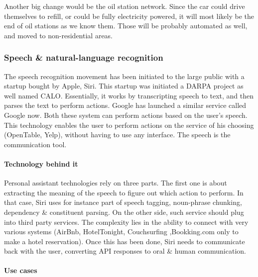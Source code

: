 \documentclass[12pt]{article}
\begin{document}
\smallskip

Another big change would be the oil station network. Since the car could drive
themselves to refill, or could be fully electricity powered, it will most likely
be the end of oil stations as we know them. Those will be probably automated as
well, and moved to non-residential areas.


\subsubsection{Speech \& natural-language recognition}

The speech recognition movement has been initiated to the large public with a
startup bought by Apple, Siri. This startup was initiated a DARPA project as
well named CALO. Essentially, it works by transcripting speech to text, and then
parses the text to perform actions. Google has launched a similar service called
Google now. Both these system can perform actions based on the user's speech.
This technology enables the user to perform actions on the service of his
choosing (OpenTable, Yelp), without having to use any interface. The speech is
the communication tool.
\\

\paragraph{Technology behind it}
Personal assistant technologies rely on three parts.
The first one is about extracting the meaning of the speech to figure out which
action to perform. In that case, Siri uses for instance part of speech tagging,
noun-phrase chunking, dependency \& constituent parsing. On the other side,
such service should plug into third party services. The complexity lies in the
ability to connect with very various systems (AirBnb, HotelTonight, Couchsurfing
,Bookking.com only to make a hotel reservation). Once this has been done, Siri
needs to communicate back with the user, converting API responses to oral \&
human communication.

\paragraph{Use cases}
\end{document}
